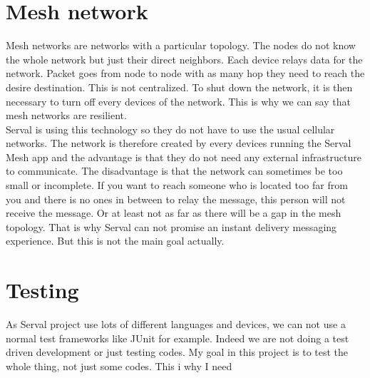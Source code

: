 \section{Mesh network}
Mesh networks are networks with a particular topology. The nodes do not know the whole network but just their direct neighbors. Each device relays data for the network. Packet goes from node to node with as many hop they need to reach the desire destination. This is not centralized. To shut down the network, it is then necessary to turn off every devices of the network. This is why we can say that mesh networks are resilient. \\
Serval is using this technology so they do not have to use the usual cellular networks. The network is therefore created by every devices running the Serval Mesh app and the advantage is that they do not need any external infrastructure to communicate. The disadvantage is that the network can sometimes be too small or incomplete. If you want to reach someone who is located too far from you and there is no ones in between to relay the message, this person will not receive the message. Or at least not as far as there will be a gap in the mesh topology. That is why Serval can not promise an instant delivery messaging experience. But this is not the main goal actually.

\section{Testing} 
As Serval project use lots of different languages and devices, we can not use a normal test frameworks like JUnit for example. Indeed we are not doing a test driven development or just testing codes. My goal in this project is to test the whole thing, not just some codes. This i why I need
